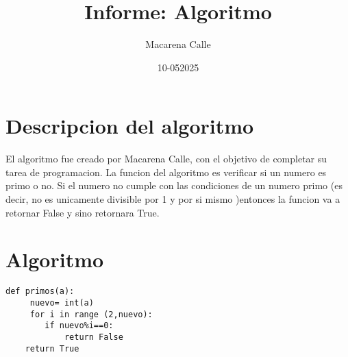 \documentclass{article}
\title{Informe: Algoritmo}
\author{Macarena Calle }
\date{10-052025}
\begin{document}
\maketitle

\section{Descripcion del algoritmo}
El algoritmo fue creado por Macarena Calle, con el objetivo de completar su tarea de programacion. La funcion del algoritmo es verificar si un numero es primo o no. Si el numero no cumple con las condiciones de un numero primo (es decir, no es unicamente divisible por 1 y por si mismo )entonces la funcion va a retornar False y sino retornara True.
\section{Algoritmo}
\begin{lstlisting}
def primos(a):
     nuevo= int(a)
     for i in range (2,nuevo):
        if nuevo%i==0:
            return False
    return True
\end{lstlisting}
\end{document}
